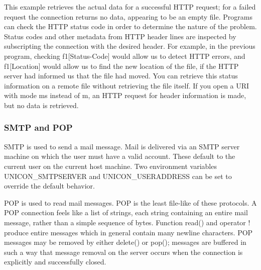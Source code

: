 

This example retrieves the actual data for a successful HTTP request;
for a failed request the connection returns no data, appearing to be an
empty file. Programs can check the HTTP status code in order to
determine the nature of the problem. Status codes and other metadata
from HTTP header lines are inspected by subscripting the connection
with the desired header. For example, in the previous program, checking
\textsf{f1[{\textquotedbl}Status-Code{\textquotedbl}]} would allow us
to detect HTTP errors, and
\textsf{f1[{\textquotedbl}Location{\textquotedbl}]} would allow us to
find the new location of the file, if the HTTP server had informed us
that the file had moved. You can retrieve this status information on a
remote file without retrieving the file itself. If you open a URI with
mode \textsf{{\textquotedbl}ms{\textquotedbl}} instead of
\textsf{{\textquotedbl}m{\textquotedbl}}, an HTTP request for header
information is made, but no data is retrieved.

\subsubsection{SMTP and POP}

SMTP is used to send a mail message. Mail is delivered via
an SMTP server machine on which the user must have a valid account.
These default to the current user on the current host machine. Two
environment variables UNICON\_SMTPSERVER and UNICON\_USERADDRESS can be
set to override the default behavior.

POP is used to read mail messages. POP is the least file-like
of these protocols. A POP connection feels like a list of strings, each
string containing an entire mail message, rather than a simple sequence
of bytes. Function \textsf{read()} and operator \textsf{!} produce
entire messages which in general contain many newline characters. POP
messages may be removed by either \textsf{delete()} or \textsf{pop()};
messages are buffered in such a way that message removal on the server
occurs when the connection is explicitly and successfully closed.

